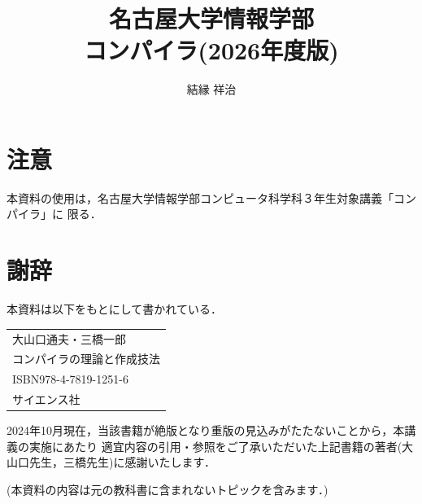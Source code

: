 \documentclass[a4j,dvipdfmx]{jbook}
\title{名古屋大学情報学部\\コンパイラ(2026年度版)}
\date{}
\author{結縁 祥治}
\begin{document}
\maketitle

\section*{注意}
本資料の使用は，名古屋大学情報学部コンピュータ科学科３年生対象講義「コンパイラ」に
限る．

\section*{謝辞}

本資料は以下をもとにして書かれている．

\begin{center}
    \begin{tabular}{l}
        大山口通夫・三橋一郎            \\
        コンパイラの理論と作成技法         \\
        ISBN978-4-7819-1251-6 \\
        サイエンス社
    \end{tabular}
\end{center}

2024年10月現在，当該書籍が絶版となり重版の見込みがたたないことから，本講義の実施にあたり
適宜内容の引用・参照をご了承いただいた上記書籍の著者(大山口先生，三橋先生)に感謝いたします．

(本資料の内容は元の教科書に含まれないトピックを含みます．)

\tableofcontents









%
%
%


\end{document}
